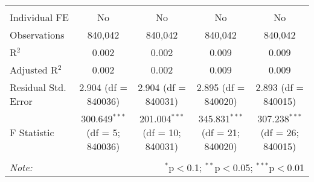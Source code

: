 \documentclass[
]{article}
\begin{document}
\begin{table}[!htbp]
{\begin{tabular}{@{\extracolsep{5pt}}lcccc}
  & & & & \\ 
\hline \\[-1.8ex] 
Individual FE & No & No & No & No \\ 
Observations & 840,042 & 840,042 & 840,042 & 840,042 \\ 
R$^{2}$ & 0.002 & 0.002 & 0.009 & 0.009 \\ 
Adjusted R$^{2}$ & 0.002 & 0.002 & 0.009 & 0.009 \\ 
Residual Std. Error & 2.904 (df = 840036) & 2.904 (df = 840031) & 2.895 (df = 840020) & 2.893 (df = 840015) \\ 
F Statistic & 300.649$^{***}$ (df = 5; 840036) & 201.004$^{***}$ (df = 10; 840031) & 345.831$^{***}$ (df = 21; 840020) & 307.238$^{***}$ (df = 26; 840015) \\ 
\hline 
\hline \\[-1.8ex] 
\textit{Note:}  & \multicolumn{4}{r}{$^{*}$p$<$0.1; $^{**}$p$<$0.05; $^{***}$p$<$0.01} \\ 
\end{tabular}
} 
\end{table} 
\newpage
\end{document}
